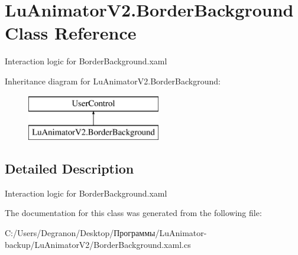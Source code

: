 \hypertarget{class_lu_animator_v2_1_1_border_background}{}\section{Lu\+Animator\+V2.\+Border\+Background Class Reference}
\label{class_lu_animator_v2_1_1_border_background}


Interaction logic for Border\+Background.\+xaml  


Inheritance diagram for Lu\+Animator\+V2.\+Border\+Background\+:\begin{figure}[H]
\begin{center}
\leavevmode
\includegraphics[height=2.000000cm]{class_lu_animator_v2_1_1_border_background}
\end{center}
\end{figure}


\subsection{Detailed Description}
Interaction logic for Border\+Background.\+xaml 



The documentation for this class was generated from the following file\+:\begin{DoxyCompactItemize}
\item 
C\+:/\+Users/\+Degranon/\+Desktop/Программы/\+Lu\+Animator-\/backup/\+Lu\+Animator\+V2/Border\+Background.\+xaml.\+cs\end{DoxyCompactItemize}
